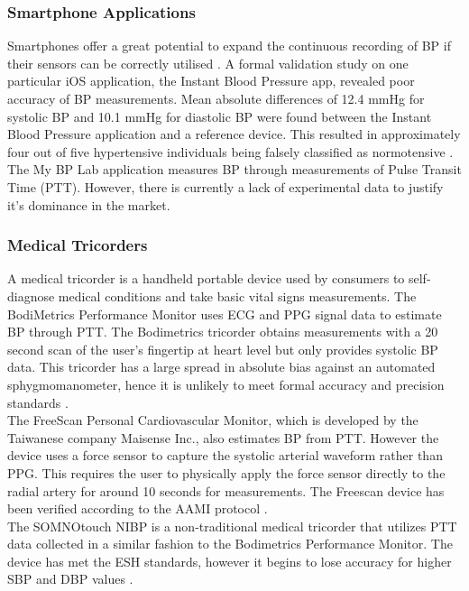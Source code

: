 \subsubsection{Smartphone Applications}
Smartphones offer a great potential to expand the continuous recording of BP if their sensors can be 
correctly utilised \cite{Bard2019}. A formal validation study on one particular iOS application, the Instant 
Blood Pressure app, revealed poor accuracy of BP measurements. Mean absolute differences of 12.4 mmHg for 
systolic BP and 10.1 mmHg for diastolic BP were found between the Instant Blood Pressure application and a
 reference device. This resulted in approximately four out of five hypertensive individuals being falsely classified 
 as normotensive  \cite{Bard2019}. The My BP Lab application measures BP through measurements of Pulse Transit 
 Time (PTT). However, there is currently a lack of experimental data to justify it's dominance in the market.

\subsubsection{Medical Tricorders}
A medical tricorder is a handheld portable device used by consumers to self-diagnose medical conditions and take 
basic vital signs measurements. The   BodiMetrics   Performance   Monitor uses ECG and PPG signal data to estimate
 BP through PTT. The Bodimetrics tricorder obtains measurements with a 20 second scan of the user's fingertip
  at heart level but only provides systolic BP data. This tricorder has a large spread in absolute bias against
   an automated sphygmomanometer, hence it is unlikely to meet formal accuracy and precision 
   standards \cite{Bard2019}. \\ \newline \noindent The FreeScan Personal Cardiovascular Monitor, which is 
   developed by the Taiwanese company Maisense Inc., also estimates BP from PTT. However the device uses a force 
   sensor to capture the systolic arterial waveform rather than PPG. This requires the user to physically apply 
   the force sensor directly to the radial artery for around 10 seconds for measurements. The Freescan device 
   has been verified according to the AAMI protocol \cite{Bard2019}. \\ \newline \noindent The SOMNOtouch
    NIBP is a non-traditional medical tricorder that utilizes PTT data collected in a similar fashion to the
     Bodimetrics Performance Monitor. The device has met the ESH standards, however it begins to lose accuracy 
     for higher SBP and DBP values \cite{Bard2019}.

